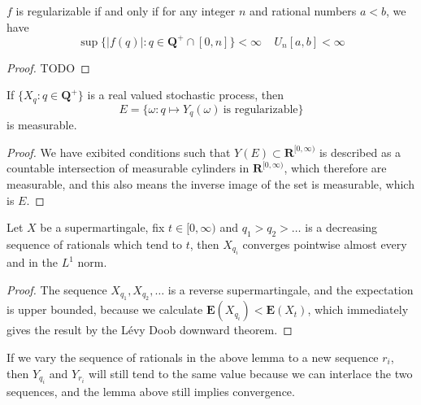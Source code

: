 \begin{lemma}
    $f$ is regularizable if and only if for any integer $n$ and rational numbers $a < b$, we have
    \[ \sup \{ |f(q)|: q \in \mathbf{Q}^+ \cap [0,n] \} < \infty\ \ \ \ \ U_n[a,b] < \infty \]
\end{lemma}
\begin{proof}
    TODO
\end{proof}

\begin{corollary}
    If $\{ X_q : q \in \mathbf{Q}^+ \}$ is a real valued stochastic process, then
    \[ E = \{ \omega: q \mapsto Y_q(\omega)\ \text{is regularizable} \} \]
    is measurable.
\end{corollary}
\begin{proof}
    We have exibited conditions such that $Y(E) \subset \mathbf{R}^{[0,\infty)}$ is described as a countable intersection of measurable cylinders in $\mathbf{R}^{[0,\infty)}$, which therefore are measurable, and this also means the inverse image of the set is measurable, which is $E$.
\end{proof}

\begin{lemma}
    Let $X$ be a supermartingale, fix $t \in [0,\infty)$ and $q_1 > q_2 > \dots$ is a decreasing sequence of rationals which tend to $t$, then $X_{q_i}$ converges pointwise almost every and in the $L^1$ norm.
\end{lemma}
\begin{proof}
    The sequence $X_{q_1}, X_{q_2}, \dots$ is a reverse supermartingale, and the expectation is upper bounded, because we calculate $\mathbf{E}(X_{q_i}) < \mathbf{E}(X_t)$, which immediately gives the result by the L\'{e}vy Doob downward theorem.
\end{proof}

If we vary the sequence of rationals in the above lemma to a new sequence $r_i$, then $Y_{q_i}$ and $Y_{r_i}$ will still tend to the same value because we can interlace the two sequences, and the lemma above still implies convergence.

